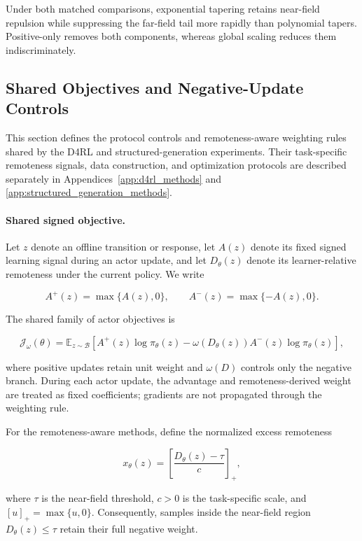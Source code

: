 \documentclass{article}
\theoremstyle{plain}
\theoremstyle{definition}
\theoremstyle{remark}
\begin{document}
Under both matched comparisons, exponential tapering retains near-field
repulsion while suppressing the far-field tail more rapidly than polynomial
tapers. Positive-only removes both components, whereas global scaling reduces
them indiscriminately.



\subsection{Shared Objectives and Negative-Update Controls}
\label{app:shared_methods}

This section defines the protocol controls and remoteness-aware
weighting rules shared by the D4RL and structured-generation experiments.
Their task-specific remoteness signals, data construction, and optimization
protocols are described separately in
Appendices~\ref{app:d4rl_methods} and
\ref{app:structured_generation_methods}.

\paragraph{Shared signed objective.}

Let \(z\) denote an offline transition or response, let
\(A(z)\) denote its fixed signed learning signal during an actor update,
and let \(D_\theta(z)\) denote its learner-relative remoteness under the
current policy. We write

\[
A^{+}(z)=\max\{A(z),0\},
\qquad
A^{-}(z)=\max\{-A(z),0\}.
\]

The shared family of actor objectives is

\[
\mathcal{J}_{\omega}(\theta)
=
\mathbb{E}_{z\sim\mathcal{B}}
\left[
A^{+}(z)\log \pi_\theta(z)
 -
\omega\!\left(D_\theta(z)\right)
A^{-}(z)\log \pi_\theta(z)
\right],
\]

where positive updates retain unit weight and
\(\omega(D)\) controls only the negative branch. During each actor
update, the advantage and remoteness-derived weight are treated as
fixed coefficients; gradients are not propagated through the weighting
rule.

For the remoteness-aware methods, define the normalized excess
remoteness

\[
x_\theta(z)
=
\left[
\frac{D_\theta(z)-\tau}{c}
\right]_{+},
\]

where \(\tau\) is the near-field threshold, \(c>0\) is the task-specific
scale, and \([u]_{+}=\max\{u,0\}\). Consequently, samples inside the
near-field region \(D_\theta(z)\leq\tau\) retain their full negative
weight.
\end{document}
